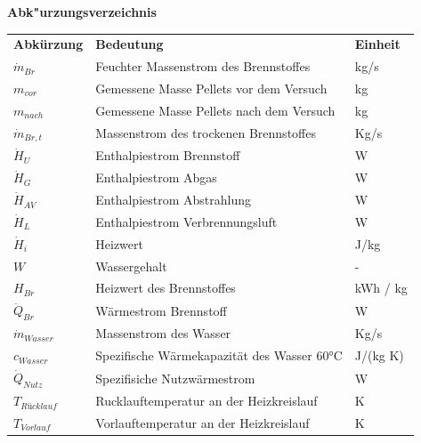 \addtocounter{table}{-1} 
\bigskip
\Large \textsf{\textbf{Abk"urzungsverzeichnis}}

\begin{longtable}{p{3 cm}p{10 cm}p{2 cm}}
\textbf{Abkürzung} & \textbf{Bedeutung} & \textbf{Einheit}\\
\(\dot{m}_{Br}\)            & Feuchter Massenstrom des Brennstoffes                &    kg/s\\
\( m_{vor}\)                & Gemessene Masse Pellets vor dem Versuch           &    kg\\
\( m_{nach}\)               & Gemessene Masse Pellets nach dem Versuch          &    kg\\
\(\dot{m}_{Br,t}\)          & Massenstrom des trockenen Brennstoffes            &    Kg/s\\
\(\dot{H}_{U}\)             & Enthalpiestrom Brennstoff                         &    W    \\                
\(\dot{H}_{G}\)             & Enthalpiestrom Abgas                              &    W    \\            
\(\dot{H}_{AV}\)            & Enthalpiestrom Abstrahlung                        &    W    \\                    
\(\dot{H}_{L}\)             & Enthalpiestrom Verbrennungsluft                   &    W    \\                        
\(\dot{H}_{i}\)             & Heizwert                                          &    J/kg   \\
\( W \)                     & Wassergehalt                                      &    -\\
\( H_{Br}\)                 & Heizwert des Brennstoffes                         &    kWh / kg\\
\(\dot{Q}_{Br}\)            & Wärmestrom Brennstoff                             &    W\\
\(\dot{m}_{Wasser}\)        & Massenstrom des Wasser                            &    Kg/s\\
\( c_{Wasser}\)             & Spezifische Wärmekapazität des Wasser 60°C        &    J/(kg K)\\
\(\dot{Q}_{Nutz}\)          & Spezifisiche Nutzwärmestrom                       &    W\\
\( T_{Rücklauf}\)           & Rucklauftemperatur an der Heizkreislauf           &    K\\
\( T_{Vorlauf}\)            & Vorlauftemperatur an der Heizkreislauf            &    K\\

\end{longtable}
